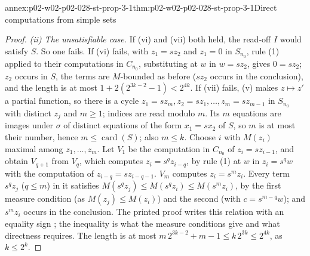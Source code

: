 \begin{annexitem}{annex:p02-w02-p02-028-st-prop-3-1}{thm:p02-w02-p02-028-st-prop-3-1}{Direct computations from simple sets}
\begin{proof}
\emph{(ii) The unsatisfiable case.}  If (vi) and (vii) both held, the
read-off \(I\) would satisfy \(S\).  So one fails.  If (vi) fails, with
\(z_1=sz_2\) and \(z_1=0\) in \(S_{n_0}\), rule (1) applied to their
computations in \(C_{n_0}\), substituting at \(w\) in \(w=sz_2\), gives
\(0=sz_2\); \(z_2\) occurs in \(S\), the terms are \(M\)-bounded as before
(\(sz_2\) occurs in the conclusion), and the length is at most
\(1+2(2^{3k-2}-1)<2^{4k}\).  If (vii) fails, (v) makes \(z\mapsto z'\) a
partial function, so there is a cycle \(z_1=sz_m,z_2=sz_1,\ldots,z_m=sz_{m-1}\)
in \(S_{n_0}\) with distinct \(z_j\) and \(m\geq1\); indices are read modulo
\(m\).  Its \(m\) equations are images under \(\sigma\) of distinct
equations of the form \(x_1=sx_2\) of \(S\), so \(m\) is at most their number,
hence \(m\leq\operatorname{card}(S)\); also \(m\leq k\).  Choose \(i\) with
\(M(z_i)\) maximal among \(z_1,\ldots,z_m\).  Let \(V_1\) be the computation
in \(C_{n_0}\) of \(z_i=sz_{i-1}\), and obtain \(V_{q+1}\) from \(V_q\), which
computes \(z_i=s^qz_{i-q}\), by rule (1) at \(w\) in \(z_i=s^qw\) with the
computation of \(z_{i-q}=sz_{i-q-1}\).  \(V_m\) computes \(z_i=s^mz_i\).
Every term \(s^qz_j\) (\(q\leq m\)) in it satisfies
\(M(s^qz_j)\leq M(s^qz_i)\leq M(s^mz_i)\), by the first measure condition
(as \(M(z_j)\leq M(z_i)\)) and the second (with \(c=s^{m-q}w\)); and
\(s^mz_i\) occurs in the conclusion.  The printed proof writes this relation
with an equality sign \cite[p.~906]{Statman1977}; the inequality is what the
measure conditions give and what directness requires.  The length is at most
\(m\,2^{3k-2}+m-1\leq k\,2^{3k}\leq2^{4k}\), as \(k\leq2^k\).
\end{proof}
\end{annexitem}

